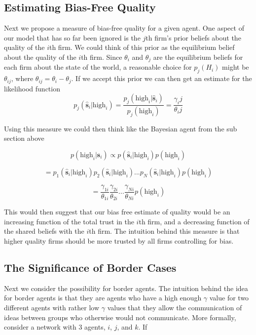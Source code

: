 \documentclass[a4paper]{article}
\begin{document}
\subsection{Estimating Bias-Free Quality}

Next we propose a measure of bias-free quality for a given agent.  One aspect of our model that has so far been ignored is the $j$th firm's prior beliefs about the quality of the $i$th firm. We could think of this prior as the equilibrium belief about the quality of the $i$th firm.  Since $\theta_i$ and $\theta_j$ are the equilibrium beliefs for each firm about the state of the world, a reasonable choice for $p_j(H_i)$ might be $\theta_{ij}$, where $\theta_{ij} = \theta_i - \theta_j$.
If we accept this prior we can then get an estimate for the likelihood function 
\[p_j(\hat{\textbf{s}}_i|\text{high}_i) = \frac{p_j(\text{high}_i|\hat{\textbf{s}}_i)}{p_j(\text{high}_i)} = \frac{\gamma_ij}{\theta_ij}\]

Using this measure we could then think like the Bayesian agent from the sub section above

\[p(\text{high}_i|\hat{\textbf{s}}_i) \propto p(\hat{\textbf{s}}_i|\text{high}_i)p(\text{high}_i)\]

\[= p_1(\hat{\textbf{s}}_i|\text{high}_i)p_2(\hat{\textbf{s}}_i|\text{high}_i)...p_N(\hat{\textbf{s}}_i|\text{high}_i)p(\text{high}_i)\]

\[= \frac{\gamma_{1i}}{\theta_{1i}}\frac{\gamma_{2i}}{\theta_{2i}}...\frac{\gamma_{Ni}}{\theta_{Ni}}p(\text{high}_i)\]

This would then suggest that our bias free estimate of quality would be an increasing function of the total trust in the $i$th firm, and a decreasing function of the shared beliefs with the $i$th firm.  The intuition behind this measure is that higher quality firms should be more trusted by all firms controlling for bias.

\subsection{The Significance of Border Cases}

Next we consider the possibility for border agents.  The intuition behind the idea for border agents is that they are agents who have a high enough $\gamma$ value for two different agents with rather low $\gamma$ values that they allow the communication of ideas between groups who otherwise would not communicate.  More formally, consider a network with 3 agents, $i$, $j$, and $k$.  If
\end{document}
